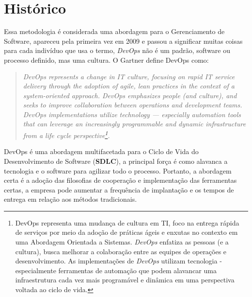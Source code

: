 \documentclass[fleqn,10pt]{../sty/SelfArx} %
\affiliation{} %
\begin{document}
	
\maketitle %
\thispagestyle{fancy} %

\section*{Histórico}

Essa metodologia é considerada uma abordagem para o Gerenciamento de Software, apareceu pela primeira vez em 2009 e passou a significar muitas coisas para cada indivíduo que usa o termo, \textit{DevOps} não é um padrão, software ou processo definido, mas uma cultura. O Gartner define DevOps como: 
\begin{quotation}
	\textit{DevOps represents a change in IT culture, focusing on rapid IT service delivery through the adoption of agile, lean practices in the context of a system-oriented approach. DevOps emphasizes people (and culture), and seeks to improve collaboration between operations and development teams. DevOps implementations utilize technology — especially automation tools that can leverage an increasingly programmable and dynamic infrastructure from a life cycle perspective\footnote{DevOps representa uma mudança de cultura em TI, foco na entrega rápida de serviços por meio da adoção de práticas ágeis e enxutas no contexto em uma Abordagem Orientada a Sistemas. \textit{DevOps} enfatiza as pessoas (e a cultura), busca melhorar a colaboração entre as equipes de operações e desenvolvimento. As implementações de \textit{DevOps} utilizam tecnologia - especialmente ferramentas de automação que podem alavancar uma infraestrutura cada vez mais programável e dinâmica em uma perspectiva voltada ao ciclo de vida.}.}
\end{quotation}

DevOps é uma abordagem multifacetada para o Ciclo de Vida do Desenvolvimento de Software (\textbf{SDLC}), a principal força é como alavanca a tecnologia e o software para agilizar todo o processo. Portanto, a abordagem certa é a adoção das filosofias de cooperação e implementação das ferramentas certas, a empresa pode aumentar a frequência de implantação e os tempos de entrega em relação aos métodos tradicionais.
\end{document}
